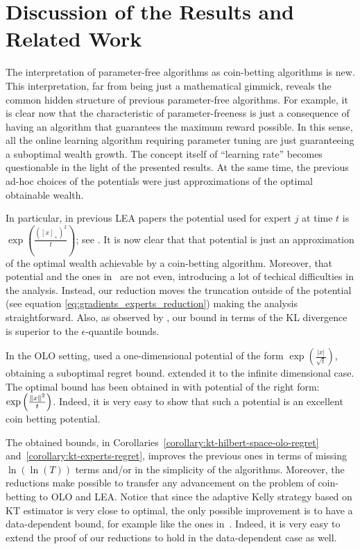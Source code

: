 \section{Discussion of the Results and Related Work}
\label{sec:discussion}

The interpretation of parameter-free algorithms as coin-betting algorithms is
new. This interpretation, far from being just a mathematical gimmick, reveals
the common hidden structure of previous parameter-free algorithms. For example,
it is clear now that the characteristic of parameter-freeness is just a
consequence of having an algorithm that guarantees the maximum reward possible.
In this sense, all the online learning algorithm requiring parameter tuning are
just guaranteeing a suboptimal wealth growth. The concept itself of ``learning
rate'' becomes questionable in the light of the presented results. At the same
time, the previous ad-hoc choices of the potentials were just approximations of
the optimal obtainable wealth.

In particular, in previous \ac{LEA} papers the potential used for expert $j$ at
time $t$ is $\exp \left(\frac{([x]_+)^2}{t} \right)$; see
\citep{ChaudhuriYH09,LuoE14,LuoS15}. It is now clear that that potential is just
an approximation of the optimal wealth achievable by a coin-betting algorithm.
Moreover, that potential and the ones in~\citet{ChernovV10,KoolenE15} are not
even, introducing a lot of techical difficulties in the analysis. Instead, our
reduction moves the truncation outside of the potential (see equation
\eqref{eq:gradients_experts_reduction}) making the analysis straightforward.
Also, as observed by \citet{ChernovV10}, our bound in terms of the KL divergence
is superior to the $\epsilon$-quantile bounds.

In the \ac{OLO} setting, \citet{StreeterM12} used a one-dimensional potential of
the form $\exp \left(\frac{|x|}{\sqrt{t}}\right)$, obtaining a suboptimal regret bound.
\citet{Orabona13} extended it to the infinite dimensional case. The optimal
bound has been obtained in \citet{McMahanO14} with potential of the right form:
$\exp \left(\frac{\left\|{x}\right\|^2}{t}\right)$. Indeed, it is very easy to show that such a
potential is an excellent coin betting potential.

The obtained bounds, in Corollaries~\ref{corollary:kt-hilbert-space-olo-regret}
and~\ref{corollary:kt-experts-regret}, improves the previous ones in terms of
missing $\ln(\ln(T))$ terms and/or in the simplicity of the algorithms.
Moreover, the reductions make possible to transfer any advancement on the
problem of coin-betting to \ac{OLO} and \ac{LEA}. Notice that since the adaptive
Kelly strategy based on \ac{KT} estimator is very close to optimal, the only
possible improvement is to have a data-dependent bound, for example like the
ones in~\cite{KoolenE15}. Indeed, it is very easy to extend the proof of our
reductions to hold in the data-dependent case as well.

